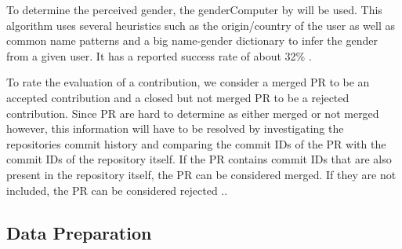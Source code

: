 To determine the perceived gender, the genderComputer by \citeauthor{vasilescu:2012:6542459} will be used. This algorithm uses several heuristics such as the origin/country of the user as well as common name patterns and a big name-gender dictionary to infer the gender from a given user. It has a reported success rate of about 32\% \cite{Vasilescu:2015:GTD:2702123.2702549}.

To rate the evaluation of a contribution, we consider a merged \ac{PR} to be an accepted contribution and a closed but not merged \ac{PR} to be a rejected contribution. Since \ac{PR} are hard to determine as either merged or not merged however, this information will have to be resolved by investigating the repositories commit history and comparing the commit IDs of the \ac{PR} with the commit IDs of the repository itself. If the \ac{PR} contains commit IDs that are also present in the repository itself, the PR can be considered merged. If they are not included, the \ac{PR} can be considered rejected \cite{Vasilescu:2015:GTD:2702123.2702549}..



 \citeauthor{Tsay:2014:IST:2568225.2568315}

\subsection{Data Preparation}

